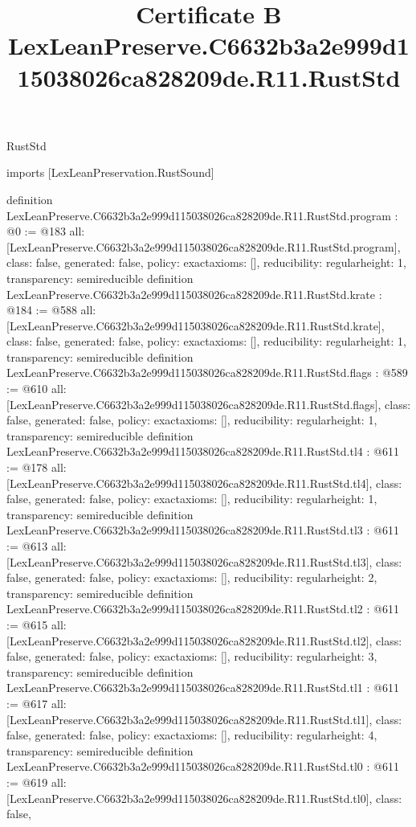 \begin{lexlean}{RustStd}
\title{Certificate B LexLeanPreserve.C6632b3a2e999d115038026ca828209de.R11.RustStd}
\begin{coremodule}
imports [LexLeanPreservation.RustSound]

definition LexLeanPreserve.C6632b3a2e999d115038026ca828209de.R11.RustStd.program : @0 := @183 {
  all: [LexLeanPreserve.C6632b3a2e999d115038026ca828209de.R11.RustStd.program],
  class: false,
  generated: false,
  policy: exact{axioms: []},
  reducibility: regular{height: 1},
  transparency: semireducible
}
definition LexLeanPreserve.C6632b3a2e999d115038026ca828209de.R11.RustStd.krate : @184 := @588 {
  all: [LexLeanPreserve.C6632b3a2e999d115038026ca828209de.R11.RustStd.krate],
  class: false,
  generated: false,
  policy: exact{axioms: []},
  reducibility: regular{height: 1},
  transparency: semireducible
}
definition LexLeanPreserve.C6632b3a2e999d115038026ca828209de.R11.RustStd.flags : @589 := @610 {
  all: [LexLeanPreserve.C6632b3a2e999d115038026ca828209de.R11.RustStd.flags],
  class: false,
  generated: false,
  policy: exact{axioms: []},
  reducibility: regular{height: 1},
  transparency: semireducible
}
definition LexLeanPreserve.C6632b3a2e999d115038026ca828209de.R11.RustStd.tl4 : @611 := @178 {
  all: [LexLeanPreserve.C6632b3a2e999d115038026ca828209de.R11.RustStd.tl4],
  class: false,
  generated: false,
  policy: exact{axioms: []},
  reducibility: regular{height: 1},
  transparency: semireducible
}
definition LexLeanPreserve.C6632b3a2e999d115038026ca828209de.R11.RustStd.tl3 : @611 := @613 {
  all: [LexLeanPreserve.C6632b3a2e999d115038026ca828209de.R11.RustStd.tl3],
  class: false,
  generated: false,
  policy: exact{axioms: []},
  reducibility: regular{height: 2},
  transparency: semireducible
}
definition LexLeanPreserve.C6632b3a2e999d115038026ca828209de.R11.RustStd.tl2 : @611 := @615 {
  all: [LexLeanPreserve.C6632b3a2e999d115038026ca828209de.R11.RustStd.tl2],
  class: false,
  generated: false,
  policy: exact{axioms: []},
  reducibility: regular{height: 3},
  transparency: semireducible
}
definition LexLeanPreserve.C6632b3a2e999d115038026ca828209de.R11.RustStd.tl1 : @611 := @617 {
  all: [LexLeanPreserve.C6632b3a2e999d115038026ca828209de.R11.RustStd.tl1],
  class: false,
  generated: false,
  policy: exact{axioms: []},
  reducibility: regular{height: 4},
  transparency: semireducible
}
definition LexLeanPreserve.C6632b3a2e999d115038026ca828209de.R11.RustStd.tl0 : @611 := @619 {
  all: [LexLeanPreserve.C6632b3a2e999d115038026ca828209de.R11.RustStd.tl0],
  class: false,
}
\end{coremodule}
\end{lexlean}
